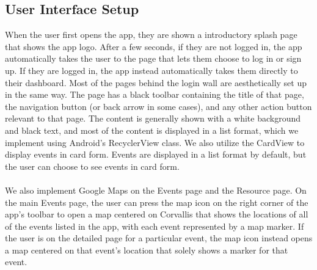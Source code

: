 \documentclass[onecolumn, draftclsnofoot,10pt, compsoc]{IEEEtran}
\begin{document}
	\subsection{User Interface Setup}
		When the user first opens the app, they are shown a introductory splash page that shows the app logo. After a few seconds, if they are not logged in, the app automatically takes the user to the page that lets them choose to log in or sign up. If they are logged in, the app instead automatically takes them directly to their dashboard. Most of the pages behind the login wall are aesthetically set up in the same way. The page has a black toolbar containing the title of that page, the navigation button (or back arrow in some cases), and any other action button relevant to that page. The content is generally shown with a white background and black text, and most of the content is displayed in a list format, which we implement using Android’s RecyclerView class. We also utilize the CardView to display events in card form. Events are displayed in a list format by default, but the user can choose to see events in card form. \\ \\
		We also implement Google Maps on the Events page and the Resource page. On the main Events page, the user can press the map icon on the right corner of the app’s toolbar to open a map centered on Corvallis that shows the locations of all of the events listed in the app, with each event represented by a map marker. If the user is on the detailed page for a particular event, the map icon instead opens a map centered on that event’s location that solely shows a marker for that event.
\end{document}
